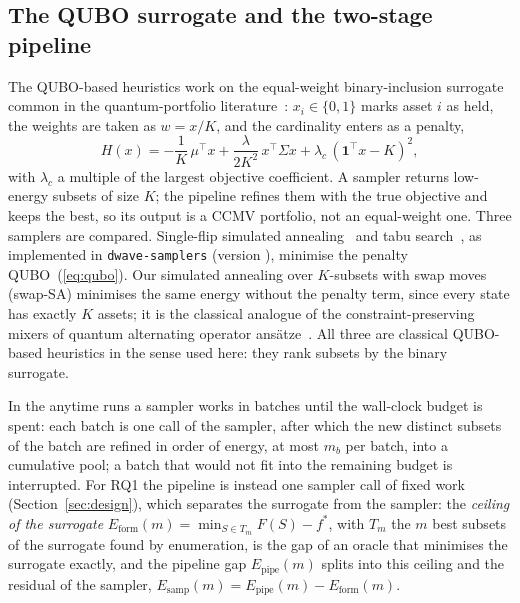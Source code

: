 \subsection{The QUBO surrogate and the two-stage pipeline}\label{sec:qubo}

The QUBO-based heuristics work on the equal-weight binary-inclusion surrogate common in the quantum-portfolio
literature~\cite{lucas2014ising,glover2019quantum}: $x_i \in \{0, 1\}$ marks asset $i$ as held, the weights are taken as
$w = x/K$, and the cardinality enters as a penalty,
\begin{equation}\label{eq:qubo}
H(x) = -\frac{1}{K}\,\mu^{\top}x + \frac{\lambda}{2K^{2}}\, x^{\top}\Sigma x + \lambda_c\, (\mathbf{1}^{\top}x - K)^{2},
\end{equation}
with $\lambda_c$ a multiple of the largest objective coefficient. A sampler returns low-energy subsets of size $K$;
the pipeline refines them with the true objective and keeps the best, so its output is a CCMV portfolio, not an
equal-weight one. Three samplers are compared. Single-flip simulated annealing~\cite{kirkpatrick1983optimization} and
tabu search~\cite{glover1986future}, as implemented in \texttt{dwave-samplers} (version ), minimise the
penalty QUBO~(\ref{eq:qubo}). Our simulated annealing over $K$-subsets with swap moves (swap-SA) minimises the same
energy without the penalty term, since every state has exactly $K$ assets; it is the classical analogue of the
constraint-preserving mixers of quantum alternating operator ansätze~\cite{hadfield2019quantum}. All three are
classical QUBO-based heuristics in the sense used here: they rank subsets by the binary surrogate.

In the anytime runs a sampler works in batches until the wall-clock budget is spent: each batch is one call of the
sampler, after which the new distinct subsets of the batch are refined in order of energy, at most $m_b$ per batch,
into a cumulative pool; a batch that would not fit into the remaining budget is interrupted. For RQ1 the pipeline is
instead one sampler call of fixed work (Section~\ref{sec:design}), which separates the surrogate from the sampler: the
\emph{ceiling of the surrogate} $E_{\mathrm{form}}(m) = \min_{S \in T_m} F(S) - f^{*}$, with $T_m$ the $m$ best
subsets of the surrogate found by enumeration, is the gap of an oracle that minimises the surrogate exactly, and the
pipeline gap $E_{\mathrm{pipe}}(m)$ splits into this ceiling and the residual of the sampler,
$E_{\mathrm{samp}}(m) = E_{\mathrm{pipe}}(m) - E_{\mathrm{form}}(m)$.


